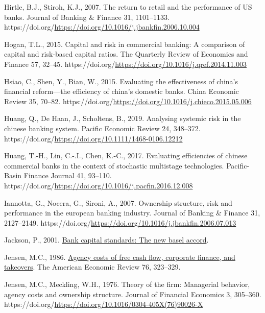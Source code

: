 \documentclass[
  12pt,
  a4paper,
]{scrreprt}
\newlength{\cslhangindent}
\newenvironment{CSLReferences}[2] %
 {\begin{list}{}{%
  \setlength{\itemindent}{0pt}
  \setlength{\leftmargin}{0pt}
  \setlength{\parsep}{0pt}
  \ifodd #1
   \setlength{\leftmargin}{\cslhangindent}
   \setlength{\itemindent}{-1\cslhangindent}
  \fi
  \setlength{\itemsep}{#2\baselineskip}}}
 {\end{list}}
\begin{document}
{{{{\begin{CSLReferences}{1}{0}
Hirtle, B.J., Stiroh, K.J., 2007. The return to retail and the
performance of US banks. Journal of Banking \& Finance 31, 1101--1133.
https://doi.org/\url{https://doi.org/10.1016/j.jbankfin.2006.10.004}

Hogan, T.L., 2015. Capital and risk in commercial banking: A comparison
of capital and risk-based capital ratios. The Quarterly Review of
Economics and Finance 57, 32--45.
https://doi.org/\url{https://doi.org/10.1016/j.qref.2014.11.003}

Hsiao, C., Shen, Y., Bian, W., 2015. Evaluating the effectiveness of
china's financial reform---the efficiency of china's domestic banks.
China Economic Review 35, 70--82.
https://doi.org/\url{https://doi.org/10.1016/j.chieco.2015.05.006}

Huang, Q., De Haan, J., Scholtens, B., 2019. Analysing systemic risk in
the chinese banking system. Pacific Economic Review 24, 348--372.
https://doi.org/\url{https://doi.org/10.1111/1468-0106.12212}

Huang, T.-H., Lin, C.-.I., Chen, K.-C., 2017. Evaluating efficiencies of
chinese commercial banks in the context of stochastic multistage
technologies. Pacific-Basin Finance Journal 41, 93--110.
https://doi.org/\url{https://doi.org/10.1016/j.pacfin.2016.12.008}

Iannotta, G., Nocera, G., Sironi, A., 2007. Ownership structure, risk
and performance in the european banking industry. Journal of Banking \&
Finance 31, 2127--2149.
https://doi.org/\url{https://doi.org/10.1016/j.jbankfin.2006.07.013}

Jackson, P., 2001.
\href{https://www.bankofengland.co.uk/quarterly-bulletin/2001/q1/2001-bank-capital-standards-the-new-basel-accord}{Bank
capital standards: The new basel accord}.

Jensen, M.C., 1986.
\href{http://www.jstor.org.queens.ezp1.qub.ac.uk/stable/1818789}{Agency
costs of free cash flow, corporate finance, and takeovers}. The American
Economic Review 76, 323--329.

Jensen, M.C., Meckling, W.H., 1976. Theory of the firm: Managerial
behavior, agency costs and ownership structure. Journal of Financial
Economics 3, 305--360.
https://doi.org/\url{https://doi.org/10.1016/0304-405X(76)90026-X}


\end{CSLReferences}}}}}
\end{document}
